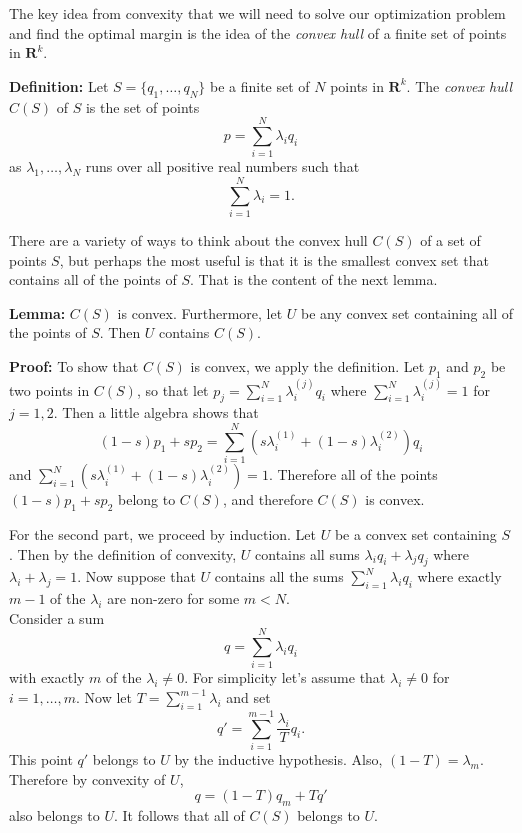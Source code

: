 \documentclass[
  oneside]{scrbook}
\begin{document}
The key idea from convexity that we will need to solve our optimization
problem and find the optimal margin is the idea of the \emph{convex
hull} of a finite set of points in \(\mathbf{R}^{k}\).

\textbf{Definition:} Let \(S=\{q_1,\ldots, q_{N}\}\) be a finite set of
\(N\) points in \(\mathbf{R}^{k}\). The \emph{convex hull} \(C(S)\) of
\(S\) is the set of points \[
p = \sum_{i=1}^{N} \lambda_{i}q_{i}
\] as \(\lambda_{1},\ldots,\lambda_{N}\) runs over all positive real
numbers such that \[
\sum_{i=1}^{N} \lambda_{i} = 1.
\]

There are a variety of ways to think about the convex hull \(C(S)\) of a
set of points \(S\), but perhaps the most useful is that it is the
smallest convex set that contains all of the points of \(S\). That is
the content of the next lemma.

\textbf{Lemma:} \(C(S)\) is convex. Furthermore, let \(U\) be any convex
set containing all of the points of \(S\). Then \(U\) contains \(C(S)\).

\textbf{Proof:} To show that \(C(S)\) is convex, we apply the
definition. Let \(p_1\) and \(p_2\) be two points in \(C(S)\), so that
let \(p_{j}=\sum_{i=1}^{N} \lambda^{(j)}_{i}q_{i}\) where
\(\sum_{i=1}^{N}\lambda^{(j)}_{i} = 1\) for \(j=1,2\). Then a little
algebra shows that \[
(1-s)p_1+sp_{2} = \sum_{i=1}^{N} (s\lambda^{(1)}_{i}+(1-s)\lambda^{(2)}_{i})q_{i}
\] and
\(\sum_{i=1}^{N} (s\lambda^{(1)}_{i}+(1-s)\lambda^{(2)}_{i}) = 1\).
Therefore all of the points \((1-s)p_{1}+sp_{2}\) belong to \(C(S)\),
and therefore \(C(S)\) is convex.

For the second part, we proceed by induction. Let \(U\) be a convex set
containing \(S\). Then by the definition of convexity, \(U\) contains
all sums \(\lambda_{i}q_{i}+\lambda_{j}q_{j}\) where
\(\lambda_i+\lambda_j=1\). Now suppose that \(U\) contains all the sums
\(\sum_{i=1}^{N} \lambda_{i}q_{i}\) where exactly \(m-1\) of the
\(\lambda_{i}\) are non-zero for some \(m<N\).\\
Consider a sum \[
q = \sum_{i=1}^{N}\lambda_{i}q_{i}
\] with exactly \(m\) of the \(\lambda_{i}\not=0\). For simplicity let's
assume that \(\lambda_{i}\not=0\) for \(i=1,\ldots, m\). Now let
\(T=\sum_{i=1}^{m-1}\lambda_{i}\) and set \[
q' = \sum_{i=1}^{m-1}\frac{\lambda_{i}}{T}q_{i}.
\] This point \(q'\) belongs to \(U\) by the inductive hypothesis. Also,
\((1-T)=\lambda_{m}\). Therefore by convexity of \(U\), \[
q = (1-T)q_{m}+Tq'
\] also belongs to \(U\). It follows that all of \(C(S)\) belongs to
\(U\).
\end{document}
